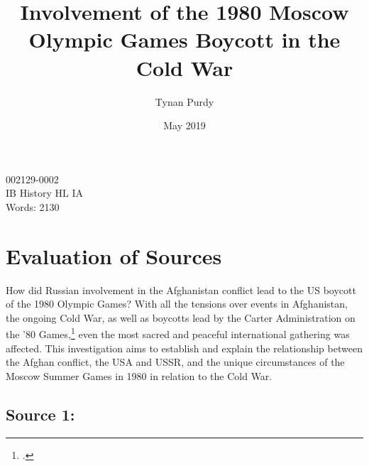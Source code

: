 \documentclass[12pt,letterpaper]{article}
\title{Involvement of the 1980 Moscow Olympic Games Boycott in the Cold War}
\author{Tynan Purdy}
\date{May 2019}
\begin{document}
\parindent=0.5in

{\fontsize{12}{14.4}
	{\singlespace
	    \maketitle
	    \begin{center}
	    002129-0002 \\
	    \vspace{4mm}
	    IB History HL IA \\
	    \vspace{4mm}
	    Words: 2130 \\ %
	\end{center}
	}
}	

\newpage
\tableofcontents
{}
\newpage

\section{Evaluation of Sources}

How did Russian involvement in the Afghanistan conflict lead to the US boycott of the 1980 Olympic Games? With all the tensions over events in Afghanistan, the ongoing Cold War, as well as boycotts lead by the Carter Administration on the '80 Games,\footcite[559]{guttmann_cold_1988} even the most sacred and peaceful international gathering was affected. This investigation aims to establish and explain the relationship between the Afghan conflict, the USA and USSR, and the unique circumstances of the Moscow Summer Games in 1980 in relation to the Cold War.

\subsection{Source 1: }
\end{document}
